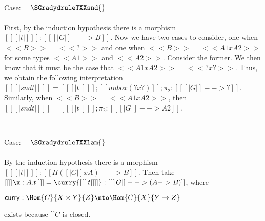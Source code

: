 \begin{description}
    \ \\
  \item Case: $\quad \SGradydruleTXXsnd{}$\\
    \\
    \noindent
    First, by the induction hypothesis there is a morphism $[[ [| t |] ]] : [[ [| G |] --> B]]$.
    Now we have two cases to consider, one when $<<B>> = <<?>>$ and one when $<<B>> = <<A1 x A2>>$
    for some types $<<A1>>$ and $<<A2>>$.  Consider the former.  We then know that it must
    be the case that $<<A1 x A2>> = <<? x ?>>$.  Thus, we obtain the following interpretation
    $[[ [| snd t |] ]] = [[ [| t |] ]];[[unbox (? x ?)]];\pi_2 : [[ [| G |] --> ?]]$.  Similarly,
    when $<<B>> = <<A1 x A2>>$, then
    $[[ [| snd t |] ]] = [[ [| t |] ]];\pi_2 : [[ [| G |] --> A2]]$.

    \ \\
  \item Case: $\quad \SGradydruleTXXlam{}$\\
    \\
    \noindent    
    By the induction hypothesis there is a morphism $[[ [| t |] ]] :
    [[ H([| G |] x A) --> B]]$.  Then take $[[ [| \x : A.t |] ]] =
    \curry {[[ [| t |] ]]} : [[ [| G |] --> (A -> B)]]$, where
    \begin{center}
      \begin{math}
        \mathsf{curry} : \Hom{C}{X \times Y}{Z} \mto \Hom{C}{X}{Y \to Z}
      \end{math}
    \end{center}
    exists because $\cat{C}$ is closed.    
   

\end{description}
